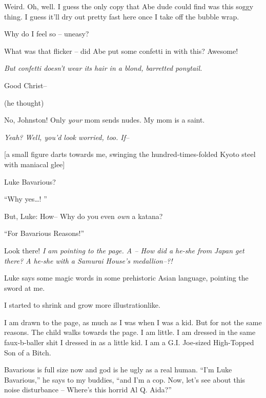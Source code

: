 Weird. Oh, well. I guess the only copy that Abe dude could find was
this soggy thing. I guess it'll dry out pretty fast here once I
take off the bubble wrap.



Why do I feel so -- uneasy?



What was that flicker -- did Abe put some confetti in with this?
Awesome!



{\em But confetti doesn't wear its hair in a blond, barretted
ponytail.



Good Christ--} (he thought)



No, Johnston! Only {\em your} mom sends nudes. My mom is a
saint.



{\em Yeah? Well, you'd look worried, too. If--}



[a small figure darts towards me, swinging the hundred-times-folded
Kyoto steel with maniacal glee]



Luke Bavarious?



``Why yes{\ldots}! ''



But, Luke: How-- Why do you even {\em own} a katana?



``For Bavarious Reasons!''



Look there! {\em I am pointing to the page. A -- How did a he-she
from Japan get there? A he-she with a Samurai House's
medallion--?!}



Luke says some magic words in some prehistoric Asian language,
pointing the sword at me.



I started to shrink and grow more illustrationlike.



I am drawn to the page, as much as I was when I was a kid. But for
not the same reasons. The child walks towards the page. I am
little. I am dressed in the same faux-b-baller shit I dressed in as
a little kid. I am a G.I. Joe-sized High-Topped Son of a
Bitch.



Bavarious is full size now and god is he ugly as a real human. ``I'm
Luke Bavarious,'' he says to my buddies, ``and I'm a cop. Now, let's
see about this noise disturbance -- Where's this horrid Al Q.
Aida?''



